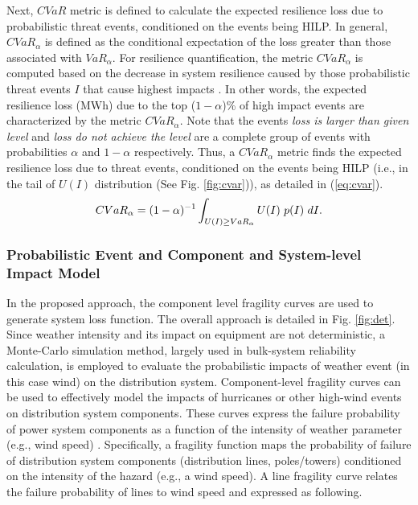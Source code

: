 \documentclass[12pt]{article}
\begin{document}
Next, $CVaR$ metric is defined to calculate the expected resilience loss due to probabilistic threat events, conditioned on the events being HILP. In general, $CVaR_{\alpha}$ is defined as the conditional expectation of the loss greater than those associated with $VaR_{\alpha}$. For resilience quantification, the metric $CVaR_{\alpha}$ is computed based on the decrease in system resilience caused by those probabilistic threat events $I$ that cause highest impacts \cite{vugrin2017resilience}. In other words, the expected resilience loss (MWh) due to the top ($1-\alpha$)\% of high impact events are characterized by the metric $CVaR_{\alpha}$. Note that the events \textit{loss is larger than given level} and \textit{loss do not achieve the level} are a complete group of events with probabilities $\alpha$ and $1-\alpha$ respectively. Thus, a $CVaR_{\alpha}$ metric finds the expected resilience loss due to threat events, conditioned on the events being HILP (i.e., in the tail of $U(I)$ distribution (See Fig. \ref{fig:cvar})),  as detailed in (\ref{eq:cvar}).
\begin{equation}\label{eq:cvar}
\small
  CVaR_{\alpha}= (1-\alpha)^{-1}\int_{U(I)\geq VaR_{\alpha} }^{} U(I)\ p(I)\ dI.
 \end{equation}
 
\subsubsection{Probabilistic Event and Component and System-level Impact Model}
 
 In the proposed approach, the component level fragility curves are used to generate system loss function. The overall approach is detailed in Fig. \ref{fig:det}. Since weather intensity and its impact on equipment are not deterministic, a Monte-Carlo simulation method, largely used in bulk-system reliability calculation, is employed to evaluate the probabilistic impacts of weather event (in  this case wind) on the distribution system. Component-level fragility curves can be used to effectively model the impacts of hurricanes or other high-wind events on distribution system components. These curves express the failure probability of power system components as a function of the intensity of weather parameter (e.g., wind speed) \cite{panteli2017metrics}. Specifically, a fragility function maps the probability of failure of distribution system components (distribution lines, poles/towers) conditioned on the intensity of the hazard (e.g., a wind speed). A line fragility curve relates the failure probability of lines to wind speed and expressed as following.  
\end{document}
